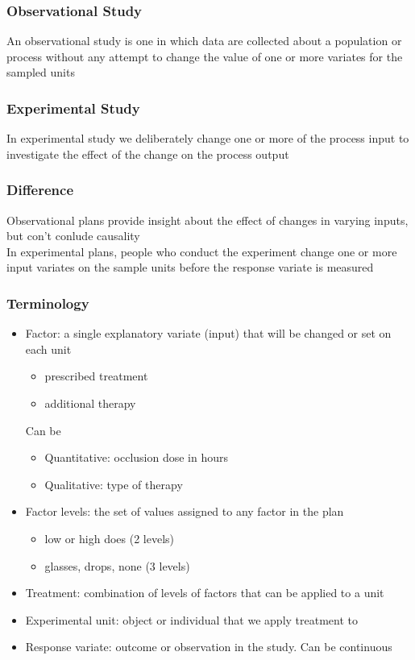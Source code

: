 \documentclass[11pt]{article}
\begin{document}
\subsubsection{Observational Study}
An observational study is one in which data are collected about a population or process without any attempt to change the value of one or more variates for the sampled units 
\subsubsection{Experimental Study}
In experimental study we deliberately change one or more of the process input to investigate the effect of the change on the process output 
\subsubsection*{Difference}
Observational plans provide insight about the effect of changes in varying inputs, but con't conlude causality \\
In experimental plans, people who conduct the experiment change one or more input variates on the sample units before the response variate is measured 
\subsubsection{Terminology}
\begin{itemize}
    \item Factor: a single explanatory variate (input) that will be changed or set on each unit 
    \begin{itemize}
        \item prescribed treatment 
        \item additional therapy
    \end{itemize}
    Can be 
    \begin{itemize}
        \item Quantitative: occlusion dose in hours
        \item Qualitative: type of therapy 
    \end{itemize}
    \item Factor levels: the set of values assigned to any factor in the plan 
    \begin{itemize}
        \item low or high does (2 levels)
        \item glasses, drops, none (3 levels)
    \end{itemize}
    \item Treatment: combination of levels of factors that can be applied to a unit 
    \item Experimental unit: object or individual that we apply treatment to 
    \item Response variate: outcome or observation in the study. Can be continuous 
\end{itemize}
\end{document}
